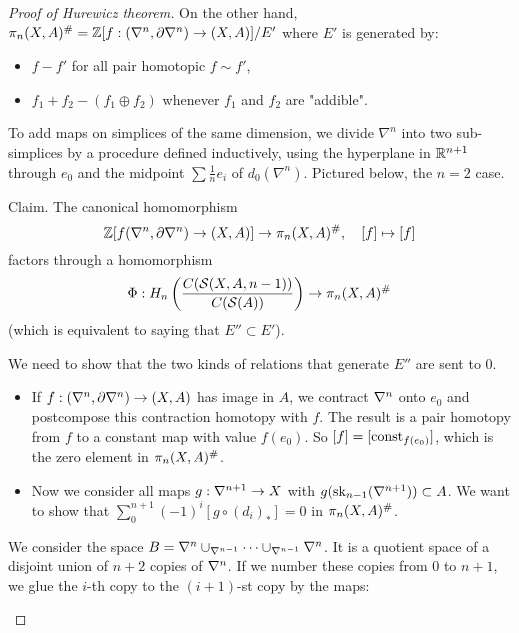 \begin{proof}[Proof of Hurewicz theorem]
On the other hand, $\pi_n(X,A)^\#={\mathbb Z}[f:(\nabla^n,\partial\nabla^n)\to(X,A)]/E'$
where $E'$ is generated by:
\begin{itemize}[label={-}]
    \item $f-f'$ for all pair homotopic $f\sim f'$,
    \item $f_1+f_2-(f_1\oplus f_2)$ whenever $f_1$ and $f_2$ are "addible".
\end{itemize}

To add maps on simplices of the same dimension, we divide $\nabla^n$ into two sub-simplices by
a procedure defined inductively, using the hyperplane in $\mathbb{R}^{n+1}$ through $e_0$ and the midpoint $\sum \frac{1}{n}e_i$ of $d_0(\nabla^n)$. Pictured below, the $n=2$ case.


Claim. The canonical homomorphism
\[{\mathbb Z}[f(\nabla^n,\partial\nabla^n)\to(X,A)]\to \pi_n(X,A)^\#,\quad [f]\mapsto[f]\]
factors through a homomorphism
\[\Phi: H_n\left(\frac{C(\mathcal{S}(X,A,n-1))}{C(\mathcal{S}(A))}\right)\to\pi_n(X,A)^\#\]
(which is equivalent to saying that $E''\subset E'$).

\begin{claimproof}
We need to show that the two kinds of relations that generate $E''$ are sent to $0$.
\begin{itemize}[label={-}]
    \item If $f:(\nabla^n,\partial\nabla^n)\to(X,A)$ has image in $A$, we contract $\nabla^n$ onto $e_0$ and postcompose this contraction homotopy with $f$. The result is a pair homotopy from $f$ to a constant map with value $f(e_0)$. So $[f]=[\operatorname{const}_{f(e_0)}]$, which is the zero element in $\pi_n(X,A)^\#$.
    \item Now we consider all maps $g:\nabla^{n+1}\to X$ with $g(\operatorname{sk}_{n-1}(\nabla^{n+1}))\subset A$. We want to show that $\sum_0^{n+1}(-1)^i [g\circ(d_i)_*]=0$ in $\pi_n(X,A)^\#$.
\end{itemize}

We consider the space $B=\nabla^{n}\cup_{\nabla^{n-1}}\dots\cup_{\nabla^{n-1}}\nabla^{n}$. It is a quotient space of a disjoint union of $n+2$ copies of $\nabla^n$. If we number these copies from $0$ to $n+1$, we glue the $i$-th copy to the $(i+1)$-st copy by the maps:
\begin{center}
\end{center}


\end{claimproof}
\end{proof}
